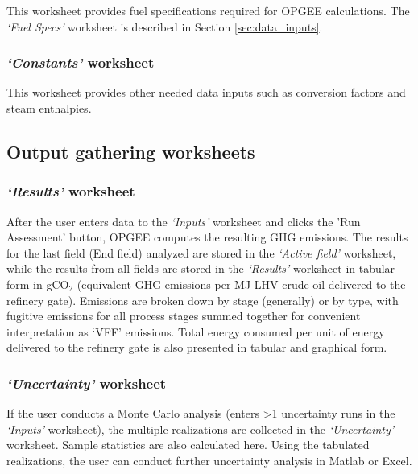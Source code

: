 \documentclass[11pt]{report}
\newcommand{\sheet}[1]{\textit{`{#1}'}}
\begin{document}
This worksheet provides fuel specifications required for OPGEE calculations. The \sheet{Fuel Specs} worksheet is described in Section \ref{sec:data_inputs}.

\subsubsection{\sheet{Constants} worksheet} 

This worksheet provides other needed data inputs such as conversion factors and steam enthalpies. 

\subsection{Output gathering worksheets} 

\subsubsection{\sheet{Results} worksheet}

After the user enters data to the \sheet{Inputs} worksheet and clicks the 'Run Assessment' button, OPGEE computes the resulting GHG emissions. The results for the last field (End field) analyzed are stored in the \sheet{Active field} worksheet, while the results from all fields are stored in the \sheet{Results} worksheet in tabular form in gCO$_2$ (equivalent GHG emissions per MJ LHV crude oil delivered to the refinery gate). Emissions are broken down by stage (generally) or by type, with fugitive emissions for all process stages summed together for convenient interpretation as `VFF' emissions. Total energy consumed per unit of energy delivered to the refinery gate is also presented in tabular and graphical form.

\subsubsection{\sheet{Uncertainty} worksheet} 

If the user conducts a Monte Carlo analysis (enters >1 uncertainty runs in the \sheet{Inputs} worksheet), the multiple realizations are collected in the \sheet{Uncertainty} worksheet. Sample statistics are also calculated here. Using the tabulated realizations, the user can conduct further uncertainty analysis in Matlab or Excel.

\clearpage


\end{document}
